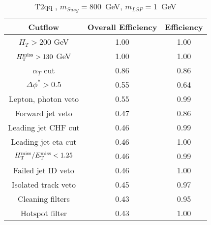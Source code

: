 \begin{longtable}{| c | c | c  | }
\caption{T2qq , $m_{Susy} = 800 $~GeV, $m_{LSP} = 1$~GeV} \label{tab: T2qq  800  1 } \\    \hline 
\textbf{Cutflow} & \textbf{Overall Efficiency} & \textbf{Efficiency}\\ \hline 
$H_{T} > 200$ GeV & 1.00 & 1.00\\ \hline 
$H_{\rm T}^{\rm miss} > 130$ GeV & 1.00 & 1.00\\ \hline 
$\alpha_{T}$ cut & 0.86 & 0.86\\ \hline 
$\Delta\phi^{*} > 0.5$ & 0.55 & 0.64\\ \hline 
Lepton, photon veto & 0.55 & 0.99\\ \hline 
Forward jet veto & 0.47 & 0.86\\ \hline 
Leading jet CHF cut & 0.46 & 0.99\\ \hline 
Leading jet eta cut & 0.46 & 1.00\\ \hline 
$H_{\rm T}^{\rm miss} / E_{\rm T}^{\rm miss} < 1.25$ & 0.46 & 0.99\\ \hline 
Failed jet ID veto & 0.46 & 1.00\\ \hline 
Isolated track veto & 0.45 & 0.97\\ \hline 
Cleaning filters & 0.43 & 0.95\\ \hline 
Hotspot filter & 0.43 & 1.00\\ \hline 
    \hline 
    \hline 
\end{longtable}

